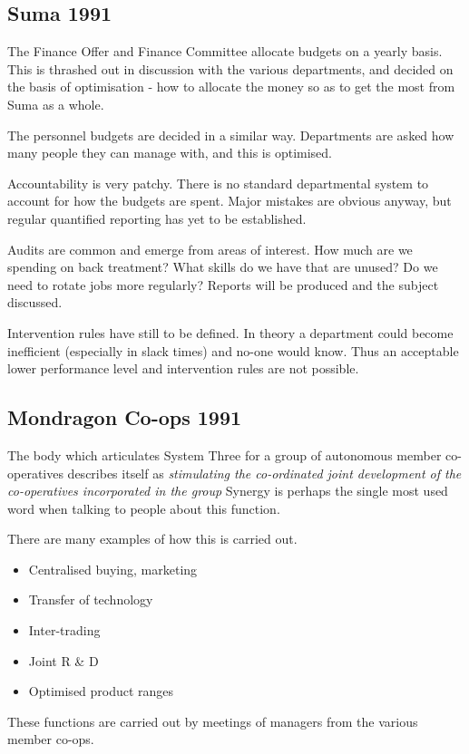 \subsection*{Suma 1991}
The Finance Offer and Finance Committee allocate budgets on a yearly basis. This is thrashed out in discussion with the various departments, and decided on the basis of optimisation - how to allocate the money so as to get the most from Suma as a whole.

The personnel budgets are decided in a similar way. Departments are asked how many people they can manage with, and this is optimised.

Accountability is very patchy. There is no standard departmental system to account for how the budgets are spent. Major mistakes are obvious anyway, but regular quantified reporting has yet to be established.

Audits are common and emerge from areas of interest. How much are we spending on back treatment? What skills do we have that are unused? Do we need to rotate jobs more regularly? Reports will be produced and the subject discussed.

Intervention rules have still to be defined. In theory a department could become inefficient (especially in slack times) and no-one would know. Thus an acceptable lower performance level and intervention rules are not possible.

\subsection*{Mondragon Co-ops 1991}
The body which articulates System Three for a group of autonomous member co-operatives describes itself as \textit{stimulating the co-ordinated joint development of the co-operatives incorporated in the group} Synergy is perhaps the single most used word when talking to people about this function.

There are many examples of how this is carried out.

\begin{itemize}
  \item Centralised buying, marketing
  \item Transfer of technology
  \item Inter-trading
  \item Joint R \& D
  \item Optimised product ranges
\end{itemize}

These functions are carried out by meetings of managers from the various member co-ops.

